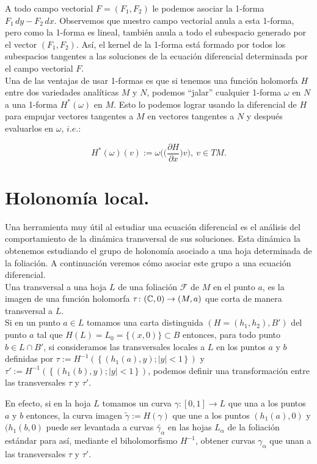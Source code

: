 A todo campo vectorial $F=(F_{1},F_{2})$ le podemos asociar la 1-forma $F_{1}\, dy - F_{2}\, dx $. Observemos que nuestro campo vectorial anula a esta 1-forma, pero como la 1-forma es lineal, también anula a todo el subespacio generado por el vector $(F_{1},F_{2})$. Así, el kernel de la 1-forma está formado por todos los subespacios tangentes a las soluciones de la ecuación diferencial determinada por el campo vectorial $F$.\\

Una de las ventajas de usar 1-formas es que si tenemos una función holomorfa $H$ entre dos variedades analíticas $M$ y $N$, podemos ``jalar'' cualquier 1-forma $\omega$ en $N$ a una 1-forma $H^{*}(\omega)$ en $M$. Esto lo podemos lograr usando la diferencial de $H$ para empujar vectores tangentes a $M$ en vectores tangentes a $N$ y después evaluarlos en $\omega$, $\mathit{i.e.}$:

\begin{equation}
H^{*}(\omega)(v):=\omega\Big(\Big(\frac{\partial H}{\partial x}\Big)v\Big),\ v\in TM.
\end{equation}

\section{Holonomía local.}

Una herramienta muy útil al estudiar una ecuación diferencial es el análisis del comportamiento de la dinámica transversal de sus soluciones. Esta dinámica la obtenemos estudiando el grupo de holonomía asociado a una hoja determinada de la foliación. A continuación veremos cómo asociar este grupo a una ecuación diferencial.\\

Una transversal a una hoja $L$ de una foliación $\mathcal{F}$ de $M$ en el punto $a$, es la imagen de una función holomorfa $\tau\colon (\mathbb{C},0)\rightarrow (M,a)$ que corta de manera transversal a $L$.\\

Si en un punto $a\in L$ tomamos una carta distinguida $(H=(h_{1},h_{2}),B')$ del punto $a$ tal que $H(L)=L_{0}=\{(x,0)\}\subset B$ entonces, para todo punto $b\in L\cap B'$, si consideramos las transversales locales a $L$ en los puntos $a$ y $b$ definidas por $\tau:=H^{-1}(\,\{\,(h_{1}(a),y); \left|y\right|<1 \,\}\,)$ y $\tau':=H^{-1}(\,\{\,(h_{1}(b),y); \left|y\right|<1 \,\}\,)$, podemos definir una transformación entre las transversales $\tau$ y $\tau'$.

En efecto, si en la hoja $L$ tomamos un curva $\gamma\colon [0,1]\rightarrow L$ que una a los puntos $a$ y $b$ entonces, la curva imagen $\tilde{\gamma}:=H(\gamma)$ que une a los puntos $(h_{1}(a),0)$ y $(h_{1}(b,0)$ puede ser levantada a curvas $\tilde{\gamma_{\alpha}}$ en las hojas $L_{\alpha}$ de la foliación estándar para así, mediante el biholomorfismo $H^{-1}$, obtener curvas $\gamma_{\alpha}$ que unan a las transversales $\tau$ y $\tau'$.\\

